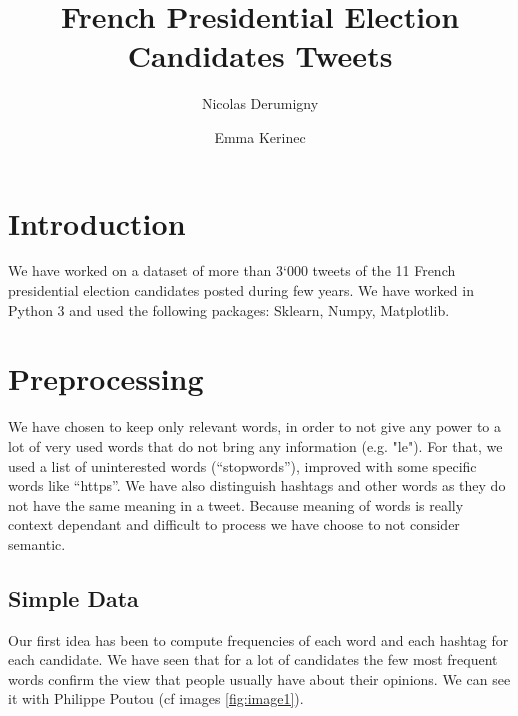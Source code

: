 \documentclass[a4paper]{article}
\title{French Presidential Election Candidates Tweets}
\author{Nicolas Derumigny \and Emma Kerinec}
\theoremstyle{definition}
\begin{document}
\maketitle

\section{Introduction}
We have worked on a dataset of more than 3`000 tweets of the 11 French presidential election candidates posted during few years.
We have worked in Python 3 and used the following packages: Sklearn, Numpy, Matplotlib.

\section{Preprocessing}
We have chosen to keep only relevant words, in order to not give any power to a lot of very used words that do not bring any information (e.g. "le"). For that, we used a list of uninterested words (``stopwords''), improved with some specific words like ``https''.
We have also distinguish hashtags and other words as they do not have the same meaning in a tweet.
Because meaning of words is really context dependant and difficult to process we have choose to not consider semantic. 
 
\subsection{Simple Data}
Our first idea has been to compute frequencies of each word and each hashtag for each candidate.
We have seen that for a lot of candidates the few most frequent words confirm the view that people usually have about their opinions. 
We can see it with Philippe Poutou (cf images \ref{fig:image1}).
\end{document}
